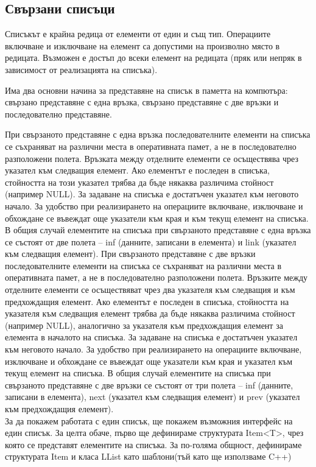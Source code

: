 \documentclass[11pt]{article} %
\begin{document}
\subsection{Свързани списъци}
Списъкът е крайна редица от елементи от един и същ тип. Операциите включване и изключване на елемент са допустими
на произволно място в редицата. Възможен е достъп до всеки елемент на редицата (пряк или непряк в зависимост от
реализацията на списъка).\par
Има два основни начина за представяне на списък в паметта на компютъра: свързано представяне с една връзка, свързано
представяне с две връзки и последователно представяне.\par
При свързаното представяне с една връзка последователните елементи на списъка се съхраняват на различни места в
оперативната памет, а не в последователно разположени полета. Връзката между отделните елементи се осъществява чрез
указател към следващия елемент. Ако елементът е последен в списъка, стойността на този указател трябва да бъде някаква
различима стойност (например NULL). За задаване на списъка е достатъчен указател към неговото начало. За удобство при
реализирането на операциите включване, изключване и обхождане се въвеждат още указатели към края и към текущ
елемент на списъка. В общия случай елементите на списъка при свързаното представяне с една връзка се състоят от две
полета – inf (данните, записани в елемента) и link (указател към следващия елемент).
При свързаното представяне с две връзки последователните елементи на списъка се съхраняват на различни места в
оперативната памет, а не в последователно разположени полета. Връзките между отделните елементи се осъществяват чрез
два указателя към следващия и към предхождащия елемент. Ако елементът е последен в списъка, стойността на указателя
към следващия елемент трябва да бъде някаква различима стойност (например NULL), аналогично за указателя към
предхождащия елемент за елемента в началото на списъка. За задаване на списъка е достатъчен указател към неговото
начало. За удобство при реализирането на операциите включване, изключване и обхождане се въвеждат още указатели към
края и указател към текущ елемент на списъка. В общия случай елементите на списъка при свързаното представяне с две
връзки се състоят от три полета – inf (данните, записани в елемента), next (указател към следващия елемент) и prev
(указател към предхождащия елемент).\\

За да покажем работата с един списък, ще покажем възможния интерфейс на един списък. За целта обаче, първо ще дефинираме структурата Item<T>, чрез която се представят елементите на списъка. За по-голяма общност, дефинираме структурата Item и класа LList като шаблони(тъй като ще използваме C++)
\end{document}
